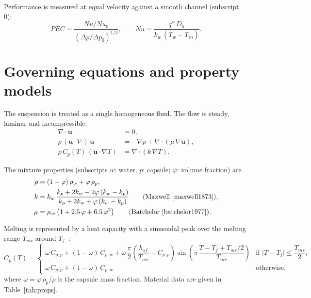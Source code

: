 \documentclass[11pt,a4paper]{article}
\begin{document}
Performance is measured at equal velocity against a smooth channel (subscript 0):
\begin{equation}
PEC = \frac{Nu/Nu_0}{\left(\Delta p/\Delta p_0\right)^{1/3}}, \qquad
Nu = \frac{q''\,D_h}{k_w\,(\overline{T}_w - T_{in})}.
\label{eq:pec}
\end{equation}

\section{Governing equations and property models}
The suspension is treated as a single homogeneous fluid. The flow is steady, laminar and incompressible:
\begin{align}
\nabla\cdot\mathbf{u} &= 0, \label{eq:mass}\\
\rho\,(\mathbf{u}\cdot\nabla)\,\mathbf{u} &= -\nabla p + \nabla\cdot\left(\mu\,\nabla\mathbf{u}\right), \label{eq:mom}\\
\rho\,C_p(T)\,(\mathbf{u}\cdot\nabla T) &= \nabla\cdot\left(k\,\nabla T\right). \label{eq:energy}
\end{align}

The mixture properties (subscripts $w$: water, $p$: capsule; $\varphi$: volume fraction) are
\begin{align}
\rho &= (1-\varphi)\,\rho_w + \varphi\,\rho_p, \label{eq:rho}\\
k &= k_w\,\frac{k_p + 2k_w - 2\varphi\,(k_w - k_p)}{k_p + 2k_w + \varphi\,(k_w - k_p)} \qquad \text{(Maxwell~\cite{maxwell1873})}, \label{eq:k}\\
\mu &= \mu_w\left(1 + 2.5\,\varphi + 6.5\,\varphi^2\right) \qquad \text{(Batchelor~\cite{batchelor1977})}. \label{eq:mu}
\end{align}

Melting is represented by a heat capacity with a sinusoidal peak over the melting range $T_{mr}$ around $T_f$~\cite{ghalambaz2019}:
\begin{equation}
C_p(T) =
\begin{cases}
\omega\,C_{p,p} + (1-\omega)\,C_{p,w} + \omega\,\dfrac{\pi}{2}\left(\dfrac{h_{sf}}{T_{mr}} - C_{p,p}\right)\sin\!\left(\pi\,\dfrac{T - T_f + T_{mr}/2}{T_{mr}}\right) & \text{if } |T - T_f| \le \dfrac{T_{mr}}{2},\\[3mm]
\omega\,C_{p,p} + (1-\omega)\,C_{p,w} & \text{otherwise},
\end{cases}
\label{eq:cp}
\end{equation}
where $\omega = \varphi\,\rho_p/\rho$ is the capsule mass fraction. Material data are given in Table~\ref{tab:props}.
\end{document}
